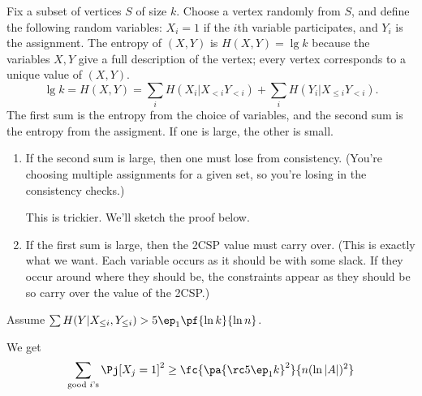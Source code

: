 Fix a subset of vertices $S$ of size $k$. Choose a vertex randomly from $S$, and define the following random variables:
$X_i=1$ if the $i$th variable participates, and $Y_i$ is the assignment.
The entropy of $(X,Y)$ is 
$H(X,Y) = \lg k$ because the variables $X,Y$ give a full description of the vertex; every vertex corresponds to a unique value of $(X,Y)$.
\[
\lg k = H(X,Y) = \sum_i H(X_i|X_{<i}Y_{<i}) +\sum_i H(Y_i|X_{\le i}Y_{<i}).
\]
The first sum is the entropy from the choice of variables, and the second sum is the entropy from the assigment. 
If one is large, the other is small. 
\begin{enumerate}
\item
If the second sum is large, then one must lose from consistency.
(You're choosing multiple assignments for a given set, so you're losing in the consistency checks.)

This is trickier. We'll sketch the proof below. %
\item
If the first sum is large, then the 2CSP value must carry over.
(This is exactly what we want. Each variable occurs as it should be with some slack. If they occur around where they should be, the constraints appear as they should be so carry over the value of the 2CSP.)
\end{enumerate}
Assume $\sum H(Y|X_{\le i},Y_{\le i})>5\ep_1\pf{\ln k}{\ln n}$. 
We get
\[
\sum_{\text{good $i$'s}} \Pj[X_j=1]^2 \ge \fc{\pa{
\rc 5\ep_1 k
}^2 }{n(\ln |A|)^2}
\]
